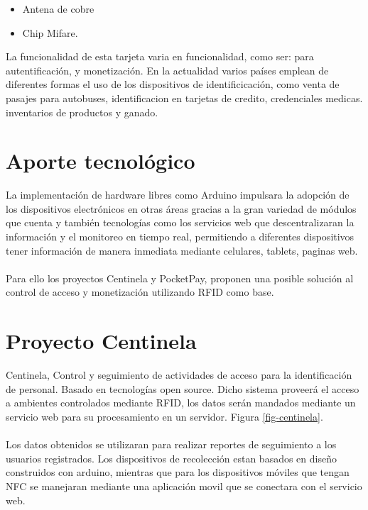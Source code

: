\documentclass[11pt,twocolumn]{article}
\begin{document}
\begin{itemize}
	\item Antena de cobre
	\item Chip Mifare.
\end{itemize}

La funcionalidad de esta tarjeta varia en funcionalidad, como ser: para autentificaci\'on, y monetizaci\'on. En la actualidad varios pa\'ises emplean de diferentes formas el uso de los dispositivos de identificicaci\'on, como venta de pasajes para autobuses, identificacion en tarjetas de credito, credenciales medicas. inventarios de productos y ganado.\\ 

\section{Aporte tecnol\'ogico}

La implementaci\'on de hardware libres como Arduino impulsara la adopci\'on de los dispositivos electr\'onicos en otras \'areas gracias a la gran variedad de m\'odulos que cuenta y tambi\'en tecnolog\'ias como los servicios web que descentralizaran la informaci\'on y el monitoreo en tiempo real, permitiendo a diferentes dispositivos tener informaci\'on de manera inmediata mediante celulares, tablets, paginas web.\\
\\
Para ello los proyectos Centinela y PocketPay, proponen una posible soluci\'on al control de acceso y monetizaci\'on utilizando RFID como base.\\

\section{Proyecto Centinela}

Centinela, Control y seguimiento de actividades de acceso para la identificaci\'on de personal. Basado en tecnolog\'ias  open source. Dicho sistema  proveer\'a el acceso a ambientes controlados mediante RFID, los datos ser\'an mandados mediante un servicio web para su procesamiento en un servidor.  Figura \ref{fig-centinela}.\\
\\
Los datos obtenidos se utilizaran para realizar reportes de seguimiento a los usuarios registrados. Los dispositivos de recolecci\'on estan basados en dise\~no construidos con arduino, mientras  que para los dispositivos m\'oviles que tengan NFC se manejaran mediante una aplicaci\'on movil que se conectara con el servicio web.\\
\end{document}

